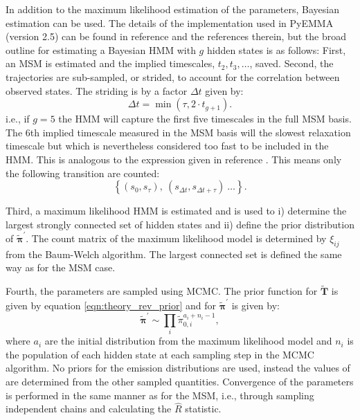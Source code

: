 In addition to the maximum likelihood estimation of the parameters, Bayesian estimation can be used. The details of the implementation used in PyEMMA (version 2.5) \cite{schererPyEMMASoftwarePackage2015a} can be found in reference \cite{choderaBayesianHiddenMarkov2011a} and the references therein, but the broad outline for estimating a Bayesian HMM with $g$ hidden states is as follows:
First, an MSM is estimated and the implied timescales, $t_{2},t_{3}, \ldots$, saved. Second, the trajectories are sub-sampled, or strided, to account for the correlation between observed states. The striding is by a factor $\Delta t$ given by:
\begin{equation}\label{eqn:hmm_striding}
    \Delta t = \min{\left(\tau, 2\cdot t_{g+1}\right)}. 
\end{equation}
i.e., if $g=5$ the HMM will  capture the first five timescales in the full MSM basis. The $6$th implied timescale measured in the MSM basis will the slowest relaxation timescale but which is nevertheless considered too fast to be included in the HMM. This is analogous to the expression given in reference \cite{noeStatisticalInefficiencyMarkov}.  This means only the following transition are counted: 
\begin{equation}
    \left\{(s_{0}, s_{\tau}),\ (s_{\Delta t}, s_{\Delta t + \tau})\ \ldots \right \}.
\end{equation}

Third, a maximum likelihood HMM is estimated and is used to i) determine the largest strongly connected set of hidden states and ii) define the prior distribution of  $\widetilde{\bm{\pi}}^{\prime}$. The count matrix of the maximum likelihood model is determined by $\xi_{ij}$ from the Baum-Welch algorithm. The largest connected set is defined the same way as for the MSM case. 

Fourth, the parameters are sampled using MCMC. The prior function for $\widetilde{\mathbf{T}}$ is given by equation \ref{eqn:theory_rev_prior} and for $\widetilde{\bm{\pi}}^{\prime}$ is given by: 
\begin{equation}
    \widetilde{\bm{\pi}}^{\prime} \sim \prod_{i} \widetilde{\pi}_{0, i}^{a_{i}+n_{i}-1},
\end{equation}
where $a_{i}$ are the initial distribution from the maximum likelihood model and $n_{i}$ is the population of each hidden state at each sampling step in the MCMC algorithm. No priors for the emission distributions are used, instead the values of are determined from the other sampled quantities. Convergence of the parameters is performed in the same manner as for the MSM, i.e., through sampling independent chains and calculating the $\hat{R}$ statistic. 

